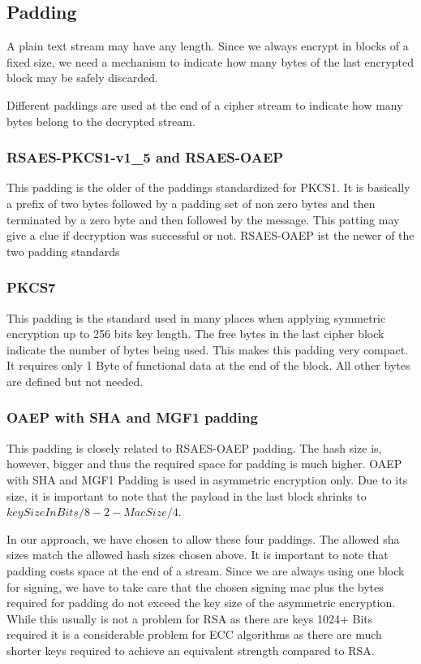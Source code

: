 \subsection{Padding}
A plain text stream may have any length. Since we always encrypt in blocks of a fixed size, we need a mechanism to indicate how many bytes of the last encrypted block may be safely discarded. 

Different paddings are used at the end of a cipher stream to indicate how many bytes belong to the decrypted stream.

\subsubsection{RSAES-PKCS1-v1\_5 and RSAES-OAEP}
This padding is the older of the paddings standardized for PKCS1. It is basically a prefix of two bytes followed by a padding set of non zero bytes and then terminated by a zero byte and then followed by the message. This patting may give a clue if decryption was successful or not. RSAES-OAEP ist the newer of the two padding standards 

\subsubsection{PKCS7} 
This padding is the standard used in many places when applying symmetric encryption up to 256 bits key length. The free bytes in the last cipher block indicate the number of bytes being used. This makes this padding very compact. It requires only 1 Byte of functional data at the end of the block. All other bytes are defined but not needed.

\subsubsection{OAEP with SHA and MGF1 padding} 
This padding is closely related to RSAES-OAEP padding. The hash size is, however, bigger and thus the required space for padding is much higher. OAEP with SHA and MGF1 Padding is used in asymmetric encryption only. Due to its size, it is important to note that the payload in the last block shrinks to $keySizeInBits/8-2-MacSize/4$.

In our approach, we have chosen to allow these four paddings. The allowed sha sizes match the allowed hash sizes chosen above. It is important to note that padding costs space at the end of a stream. Since we are always using one block for signing, we have to take care that the chosen signing mac plus the bytes required for padding do not exceed the key size of the asymmetric encryption. While this usually is not a problem for RSA as there are keys 1024+ Bits required it is a considerable problem for ECC algorithms as there are much shorter keys required to achieve an equivalent strength compared to RSA. 

